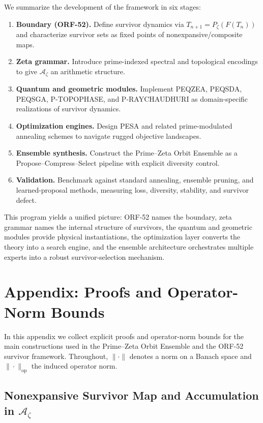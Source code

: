 \documentclass[11pt]{article}
\theoremstyle{definition}
\theoremstyle{plain}
\theoremstyle{remark}
\newcommand{\Azet}{\mathcal{A}_\zeta}
\begin{document}
We summarize the development of the framework in six stages:
\begin{enumerate}
  \item \textbf{Boundary (ORF-52).} Define survivor dynamics via $T_{n+1}=P_\zeta(F(T_n))$ and characterize survivor sets as fixed points of nonexpansive/composite maps.
  \item \textbf{Zeta grammar.} Introduce prime-indexed spectral and topological encodings to give $\Azet$ an arithmetic structure.
  \item \textbf{Quantum and geometric modules.} Implement PEQZEA, PEQSDA, PEQSGA, P-TOPOPHASE, and P-RAYCHAUDHURI as domain-specific realizations of survivor dynamics.
  \item \textbf{Optimization engines.} Design PESA and related prime-modulated annealing schemes to navigate rugged objective landscapes.
  \item \textbf{Ensemble synthesis.} Construct the Prime--Zeta Orbit Ensemble as a Propose--Compress--Select pipeline with explicit diversity control.
  \item \textbf{Validation.} Benchmark against standard annealing, ensemble pruning, and learned-proposal methods, measuring loss, diversity, stability, and survivor defect.
\end{enumerate}

This program yields a unified picture: ORF-52 names the boundary, zeta grammar names the internal structure of survivors, the quantum and geometric modules provide physical instantiations, the optimization layer converts the theory into a search engine, and the ensemble architecture orchestrates multiple experts into a robust survivor-selection mechanism.

\appendix
\section{Appendix: Proofs and Operator-Norm Bounds}
\label{appendix:proofs}

In this appendix we collect explicit proofs and operator-norm bounds for the main constructions used in the Prime--Zeta Orbit Ensemble and the ORF-52 survivor framework. Throughout, $\|\cdot\|$ denotes a norm on a Banach space and $\|\cdot\|_{\mathrm{op}}$ the induced operator norm.

\subsection{Nonexpansive Survivor Map and Accumulation in $\Azet$}
\end{document}
